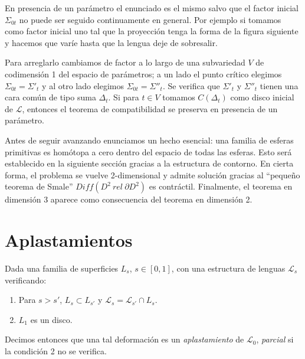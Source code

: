 \documentclass[twoside, 11pt]{article}
\begin{document}
En presencia de un parámetro el enunciado es el mismo salvo que el factor inicial $\Sigma_{0t}$ no puede ser seguido continuamente en general. Por ejemplo si tomamos como factor inicial uno tal que la proyección tenga la forma de la figura siguiente y hacemos que varíe hasta que la lengua deje de sobresalir.


 Para arreglarlo cambiamos de factor a lo largo de una subvariedad $V$ de codimensión 1 del espacio de parámetros; a un lado el punto crítico elegimos $\Sigma_{0t}=\Sigma'_t$ y al otro lado elegimos $\Sigma_{0t}=\Sigma''_t$. Se verifica que $\Sigma'_t$ y $\Sigma''_t$ tienen una cara común de tipo suma $\Delta_t$. Si para $t\in V$ tomamos $C(\Delta_t)$ como disco inicial de $\mathcal{L}$, entonces el teorema de compatibilidad se preserva en presencia de un parámetro. 

Antes de seguir avanzando enunciamos un hecho esencial: una familia de esferas primitivas es homótopa a cero dentro del espacio de todas las esferas. Esto será establecido en la siguiente sección gracias a la estructura de contorno. En cierta forma, el problema se vuelve 2-dimensional y admite solución gracias al ``pequeño teorema de Smale'' \cite[Proposición 4.2]{Bo} $Diff(D^2\ rel\ \partial D^2)$ es contráctil. Finalmente, el teorema en dimensión 3 aparece como consecuencia del teorema en dimensión 2. 
\section{Aplastamientos}\label{4}

\begin{defi}
Dada una familia de superficies $L_s$, $s\in [0,1]$, con una estructura de lenguas $\mathcal{L}_s$ verificando:
\begin{enumerate}
\item Para $s>s'$, $L_s\subset L_{s'}$ y $\mathcal{L}_s=\mathcal{L}_{s'}\cap L_s$.
\item $L_1$ es un disco. 
\end{enumerate}
Decimos entonces que una tal deformación es un \emph{aplastamiento} de $\mathcal{L}_0$, \emph{parcial} si la condición 2 no se verifica. 
\end{defi}
\end{document}
